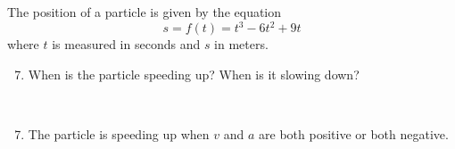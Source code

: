 \begin{frame}[t]
\begin{example}[Example 1, p. 171]
The position of a particle is given by the equation
\abovedisplayskip=0pt
\belowdisplayskip=0pt
\[
s = f(t) = t^3 - 6t^2 + 9t
\]
where $t$ is measured in seconds and $s$ in meters.
\begin{enumerate}
\setcounter{enumi}{6}
\item  When is the particle speeding up?  When is it slowing down?
\end{enumerate}
\begin{center}
\ %
%
%
%
%
\end{center}
\vspace{-.3in}
\begin{enumerate}
\setcounter{enumi}{6}
\item<2->  The particle is speeding up when $v$ and $a$ are both positive or both negative.


\end{enumerate}
\end{example}
\end{frame}
